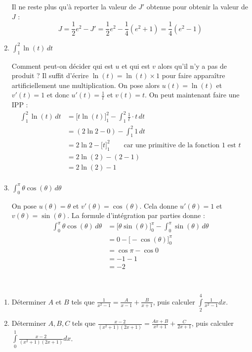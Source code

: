 \documentclass[11pt,class=report,crop=false]{standalone}
\begin{document}
\begin{enumerate}
Il ne reste plus qu'à reporter la valeur de $J'$ obtenue pour obtenir la valeur de $J$ :
$$J =  \frac12 e^2 - J' =  \frac12 e^2 - \frac14(e^2 + 1) =  \frac14(e^2 - 1)$$



\item $\int  _{1} ^{2} \ln(t) \,dt$  

Comment peut-on décider qui est $u$ et qui est $v$ alors qu'il n'y a pas de produit ?
Il suffit d'écrire $\ln(t) = \ln(t) \times 1$ pour faire apparaître artificiellement une multiplication.
On pose alors $u(t) = \ln(t)$ et $v'(t) = 1$ et donc $u'(t) = \frac1t$ et $v(t) = t$.
On peut maintenant faire une IPP :
\begin{align*}
\int  _{1} ^{2} \ln(t) \,dt
 &= \big[t\ln(t)\big] _{1} ^{2} - \int _{1} ^{2} \frac1t \cdot t \, dt \\
 &= (2\ln2-0) - \int _{1} ^{2} 1 \, dt \\
 &= 2\ln2 - \big[t\big] _{1} ^{2} \qquad \text{car une primitive de la fonction $1$ est $t$} \\ 
 &= 2\ln(2) - (2-1) \\
 &= 2\ln(2) - 1 \\
\end{align*}

\item $\int  _{0} ^{\pi} \theta \cos(\theta) \,d\theta$  

On pose $u(\theta) = \theta$ et $v'(\theta) = \cos(\theta)$.
Cela donne $u'(\theta) = 1$ et $v(\theta) = \sin(\theta)$.
La formule d'intégration par parties donne :
\begin{align*}
\int  _{0} ^{\pi} \theta \cos(\theta) \,d\theta 
 &= \big[\theta\sin(\theta) \big]_{0} ^{\pi} - \int_{0} ^{\pi} \sin(\theta) \,d\theta \\
 &= 0 - \big[ -\cos(\theta) \big]_{0} ^{\pi} \\
 &= \cos\pi - \cos0 \\
 &= -1-1 \\
 &= -2
\end{align*} 

\end{enumerate}
\fincorrection
\finexercice




\exercice{}
\enonce\ 
\begin{enumerate}
	\item Déterminer $A$ et $B$ tels que $\frac{1}{x^{2}-1} = \frac{A}{x-1}+\frac{B}{x+1}$, puis calculer $\int \limits _{2} ^{4} \frac{1}{x^{2}-1} dx$.
	\item Déterminer $A, B, C$ tels que $\frac{x-2}{(x^{2}+1)(2x+1)} = \frac{Ax+B}{x^{2}+1}+\frac{C}{2x+1}$, puis calculer
	$\int \limits _{0} ^{1} \frac{x-2}{(x^{2}+1)(2x+1)}  dx$.
\end{enumerate}
\finenonce
\end{document}
